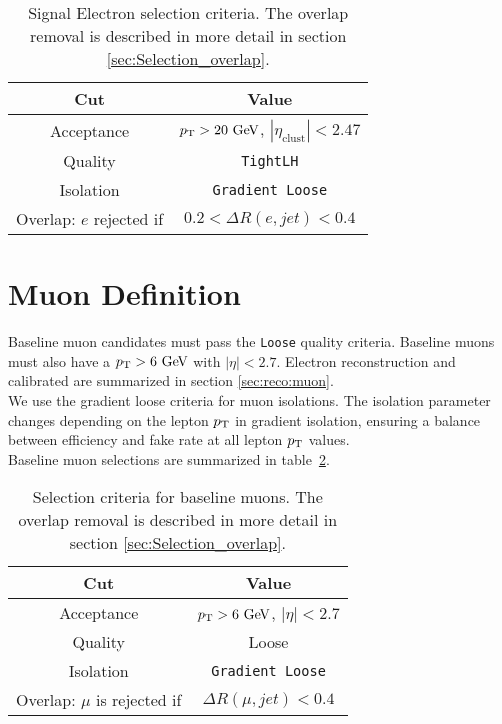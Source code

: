 \begin{table}[htp]
  \begin{center}
    \begin{tabular}{c|c} \hline \hline
      Cut & Value \\ \hline \hline
      Acceptance & $\pT > 20 \gev$, $|\eta_{\mathrm{clust}}| < 2.47$ \\ \hline
      Quality & {\tt TightLH} \\ \hline
      Isolation & {\tt Gradient Loose} \\ \hline
      Overlap: $e$ rejected if &  $0.2 < \Delta R(e,jet) < 0.4$\\ \hline%
      \hline
    \end{tabular}
  \caption{Signal Electron selection criteria. The overlap removal is described in more detail in section \ref{sec:Selection_overlap}.}
  \end{center}
  \label{tb:electrons}
\end{table}%

\section{Muon Definition}  \label{sec:MuonDef}

\indent Baseline muon candidates must pass the {\tt Loose} quality criteria.  Baseline muons must also have a $\pT > 6 \gev$ with $|\eta| < 2.7$.  Electron reconstruction and calibrated are summarized in section \ref{sec:reco:muon}. \\

\indent We use the gradient loose criteria for muon isolations. The isolation parameter changes depending on the lepton $p_{\mathrm{T}}$ in gradient isolation, ensuring a balance between efficiency and fake rate at all lepton $p_{\mathrm{T}}$ values. \\

\indent Baseline muon selections are summarized in table~\ref{tb:muons:baseline}. \\  

\begin{table}[htp]
  \begin{center}
    \begin{tabular}{c|c} \hline \hline
      Cut & Value \\ \hline \hline
      Acceptance & $\pT > 6\gev$, $|\eta| < 2.7$ \\ \hline
      Quality & Loose \\ \hline
      Isolation & {\tt Gradient Loose} \\ \hline
      Overlap: $\mu$ is rejected if &  $ \Delta R(\mu,jet) < 0.4 $ \\ \hline
      \hline
    \end{tabular}
  \caption{Selection criteria for baseline muons. The overlap removal is described in more detail in section \ref{sec:Selection_overlap}.} 
  \end{center}
  \label{tb:muons:baseline}
\end{table}%

